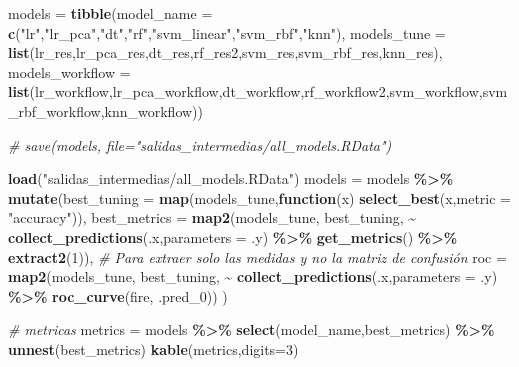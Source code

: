 \documentclass[12pt,a4paper,]{book}
\newenvironment{Shaded}{\begin{snugshade}}{\end{snugshade}}
\newcommand{\AttributeTok}[1]{\textcolor[rgb]{0.13,0.29,0.53}{#1}}
\newcommand{\CommentTok}[1]{\textcolor[rgb]{0.56,0.35,0.01}{\textit{#1}}}
\newcommand{\ControlFlowTok}[1]{\textcolor[rgb]{0.13,0.29,0.53}{\textbf{#1}}}
\newcommand{\DecValTok}[1]{\textcolor[rgb]{0.00,0.00,0.81}{#1}}
\newcommand{\FunctionTok}[1]{\textcolor[rgb]{0.13,0.29,0.53}{\textbf{#1}}}
\newcommand{\NormalTok}[1]{#1}
\newcommand{\OtherTok}[1]{\textcolor[rgb]{0.56,0.35,0.01}{#1}}
\newcommand{\SpecialCharTok}[1]{\textcolor[rgb]{0.81,0.36,0.00}{\textbf{#1}}}
\newcommand{\StringTok}[1]{\textcolor[rgb]{0.31,0.60,0.02}{#1}}
\numberwithin{dummy}{section}
\theoremstyle{ocrenumbox}
\theoremstyle{blacknumex}
\theoremstyle{blacknumbox}
\theoremstyle{ocrenum}
\theoremstyle{ocrenum}
\begin{document}
\begin{Shaded}
\begin{Highlighting}[]
\NormalTok{models }\OtherTok{=} \FunctionTok{tibble}\NormalTok{(}\AttributeTok{model\_name =} \FunctionTok{c}\NormalTok{(}\StringTok{"lr"}\NormalTok{,}\StringTok{"lr\_pca"}\NormalTok{,}\StringTok{"dt"}\NormalTok{,}\StringTok{"rf"}\NormalTok{,}\StringTok{"svm\_linear"}\NormalTok{,}\StringTok{"svm\_rbf"}\NormalTok{,}\StringTok{"knn"}\NormalTok{),}
                \AttributeTok{models\_tune =} \FunctionTok{list}\NormalTok{(lr\_res,lr\_pca\_res,dt\_res,rf\_res2,svm\_res,svm\_rbf\_res,knn\_res),}
                \AttributeTok{models\_workflow =} \FunctionTok{list}\NormalTok{(lr\_workflow,lr\_pca\_workflow,dt\_workflow,rf\_workflow2,svm\_workflow,svm\_rbf\_workflow,knn\_workflow))}

\CommentTok{\# save(models, file="salidas\_intermedias/all\_models.RData")}

\FunctionTok{load}\NormalTok{(}\StringTok{"salidas\_intermedias/all\_models.RData"}\NormalTok{)}
\NormalTok{models }\OtherTok{=}\NormalTok{ models }\SpecialCharTok{\%\textgreater{}\%} 
  \FunctionTok{mutate}\NormalTok{(}\AttributeTok{best\_tuning =} \FunctionTok{map}\NormalTok{(models\_tune,}\ControlFlowTok{function}\NormalTok{(x) }\FunctionTok{select\_best}\NormalTok{(x,}\AttributeTok{metric =} \StringTok{"accuracy"}\NormalTok{)),}
         \AttributeTok{best\_metrics =} \FunctionTok{map2}\NormalTok{(models\_tune,}
\NormalTok{                             best\_tuning,                                               }\SpecialCharTok{\textasciitilde{}} \FunctionTok{collect\_predictions}\NormalTok{(.x,}\AttributeTok{parameters =}\NormalTok{ .y) }\SpecialCharTok{\%\textgreater{}\%}                                                  \FunctionTok{get\_metrics}\NormalTok{() }\SpecialCharTok{\%\textgreater{}\%}                                                  \FunctionTok{extract2}\NormalTok{(}\DecValTok{1}\NormalTok{)), }\CommentTok{\# Para extraer solo las medidas y no la matriz de confusión}
         \AttributeTok{roc =} \FunctionTok{map2}\NormalTok{(models\_tune,}
\NormalTok{                    best\_tuning,}
                    \SpecialCharTok{\textasciitilde{}} \FunctionTok{collect\_predictions}\NormalTok{(.x,}\AttributeTok{parameters =}\NormalTok{ .y) }\SpecialCharTok{\%\textgreater{}\%}                                         \FunctionTok{roc\_curve}\NormalTok{(fire, .pred\_0))}
\NormalTok{) }

\CommentTok{\# metricas}
\NormalTok{metrics }\OtherTok{=}\NormalTok{ models }\SpecialCharTok{\%\textgreater{}\%} 
  \FunctionTok{select}\NormalTok{(model\_name,best\_metrics) }\SpecialCharTok{\%\textgreater{}\%} 
  \FunctionTok{unnest}\NormalTok{(best\_metrics)}
\FunctionTok{kable}\NormalTok{(metrics,}\AttributeTok{digits=}\DecValTok{3}\NormalTok{) }


\end{Highlighting}
\end{Shaded}
\end{document}
